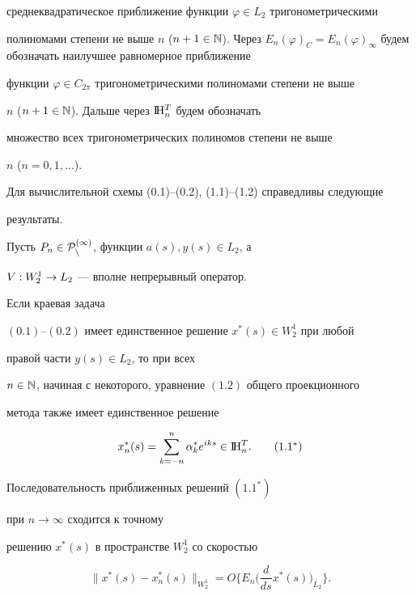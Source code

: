 среднеквадратическое приближение функции $\varphi\in L_2$ тригонометрическими


полиномами степени не выше $n$  ($n+1\in \bl{N}$). Через $E_n(\varphi )_C=


E_n(\varphi )_\infty $ будем обозначать наилучшее равномерное приближение


функции $\varphi \in C_{2\pi}$ тригонометрическими полиномами степени не выше


$n$ ($n+1\in \Bbb N$). Дальше через $\mathrm I \!\mathrm H_n^T$ будем обозначать


множество всех тригонометрических полиномов степени не выше


$n$ ($n=0, 1,\dotsc$).





Для вычислительной схемы (0.1)--(0.2), (1.1)--(1.2) справедливы следующие


результаты.





\begin{thm}


Пусть $P_n\in \cal P_n^{(1)}$, функции $a(s), y(s)\in L_2$, а


$V : W_2^1 \to L_2$ --- вполне непрерывный оператор.


Если краевая задача


$(0.1)$--$(0.2)$ имеет единственное решение $x^*(s)\in W_2^1$ при любой


правой части $y(s)\in L_2$, то при всех


$n\in \Bbb N$, начиная с некоторого, уравнение $(1.2)$ общего проекционного


метода также имеет единственное решение


\begin{equation}


x_n^*(s)=\sum_{k=-n}^n\alpha_k^* e^{iks}\in \bll{H}_n^T.


\tag{1.1$^*$}


\end{equation}


Последовательность приближенных решений $(1.1^*)$


при $n\rightarrow \infty$ сходится к точному


решению $x^*(s)$ в пространстве $W_2^1$ со скоростью


\begin{equation}


\|x^*(s)-x_n^*(s)\|_{{W_2^1}}= O \bigg\{ E_n\bigg(\frac{d}{ds} x^*(s)


\bigg)_{L_2}\bigg\} .


\end{equation}


\end{thm}





